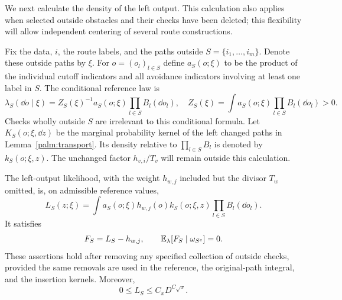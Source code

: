 We next calculate the density of the left output.  This calculation
also applies when selected outside obstacles and their checks have
been deleted; this flexibility will allow independent centering of
several route constructions.

Fix the data, $i$, the route labels, and the paths outside
$S=\{i_1,\ldots,i_m\}$.  Denote these outside paths by $\xi$.
For $o=(o_l)_{l\in S}$ define $a_S(o;\xi)$ to be the product of the
individual cutoff indicators and all avoidance indicators involving
at least one label in $S$.  The conditional reference law is
\begin{equation}\label{palm:conditional-reference}
 \lambda_S(\dd o\mid\xi)
  = Z_S(\xi)^{-1}a_S(o;\xi)\prod_{l\in S}B_l(\dd o_l),
 \quad
 Z_S(\xi)=\int a_S(o;\xi)\prod_{l\in S}B_l(\dd o_l)>0.
\end{equation}
Checks wholly outside $S$ are irrelevant to this conditional formula.
Let $K_S(o;\xi,\dd z)$ be the marginal probability kernel of the left
changed paths in Lemma~\ref{palm:transport}.  Its density relative to
$\prod_{l\in S}B_l$ is denoted by $k_S(o;\xi,z)$.
The unchanged factor $h_{v,i}/T_v$ will remain outside this calculation.

\begin{lemma}
\label{palm:likelihood}
The left-output likelihood, with the weight $h_{w,j}$ included but
the divisor $T_w$ omitted, is, on admissible reference values,
\begin{equation}\label{palm:likelihood-formula}
 L_S(z;\xi)
  =\int a_S(o;\xi)h_{w,j}(o)
          k_S(o;\xi,z)\prod_{l\in S}B_l(\dd o_l).
\end{equation}
It satisfies
\begin{equation}\label{palm:centered-identity}
 F_S=L_S-h_{w,j},\qquad
       \mathbb E_\lambda[F_S\mid\omega_{S^c}]=0.
\end{equation}
These assertions hold after removing any specified collection of
outside checks, provided the same removals are used in the reference,
the original-path integral, and the insertion kernels.  Moreover,
\begin{equation}\label{palm:local-likelihood-sup}
                    0\le L_S\le C_xD^{C\sqrt x}.
\end{equation}
\end{lemma}


